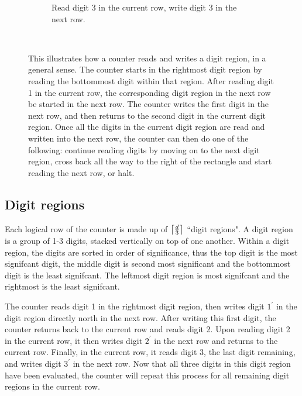 \begin{figure}[H]
\begin{subfigure}[t]{0.43\textwidth}
        \caption{\label{fig:counter_read_digit3_general_case3_middle_level} Read digit 3 in the current row, write digit 3 in the next row.}
    \end{subfigure}%
    ~
    \caption{
    \label{fig:counter_read_digit_return_read_digit_general_case3}
        This illustrates how a counter reads and writes a digit region, in a general sense.
        The counter starts in the rightmost digit region by reading the bottommost digit within
        that region. After reading digit 1 in the current row, the corresponding digit region in
        the next row be started in the next row. The counter writes the first digit in the next
        row, and then returns to the second digit in the current digit region.
        Once all the digits in the current digit region are read and written into the next row,
        the counter can then do one of the following: continue reading digits by moving on to the
        next digit region, cross back all the way to the right of the rectangle and start reading
        the next row, or halt.
    }
\end{figure}

\subsection{Digit regions}

Each logical row of the counter is made up of $\ceil*{\frac{d}{3}}$ ``digit regions".
%
A digit region is a group of 1-3 digits, stacked vertically on top of one another.
%
Within a digit region, the digits are sorted in order of significance, thus the top digit is the most signifcant digit, the middle digit
is second most significant and the bottommost digit is the least signifcant.
%
The leftmost digit region is most signifcant and the rightmost is the least signifcant.
%

The counter reads digit 1 in the rightmost digit region, then writes digit $1^\prime$ in the digit region directly north in the next row.
%
After writing this first digit, the counter returns back to the current row and reads digit 2.
%
Upon reading digit 2 in the current row, it then writes digit $2^\prime$ in the next row and returns to the current row.
%
Finally, in the current row, it reads digit 3, the last digit remaining, and writes digit $3^\prime$ in the next row.
%
Now that all three digits in this digit region have been evaluated, the counter will repeat this process for all remaining digit regions in the current row.
%

